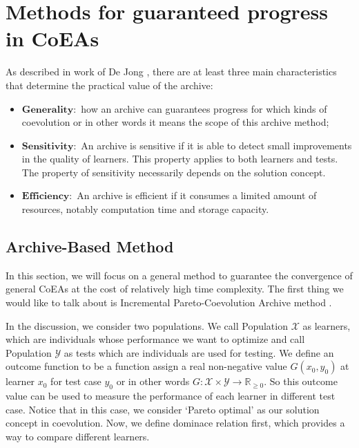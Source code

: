 \documentclass[a4paper,11pt]{report}
\theoremstyle{plain} %
\theoremstyle{definition} %
\theoremstyle{remark} %
\begin{document}
\section{Methods for guaranteed progress in CoEAs}
As described in work of De Jong \citep{kanade_incremental_2004}, there are at least three main characteristics that determine the practical value of the archive:
\begin{itemize}
    \item $\mathbf{Generality:}$ how an archive can guarantees progress for which kinds of coevolution or in other words it means the scope of this archive method;
    
    \item $\mathbf{Sensitivity:}$ An archive is sensitive if it is able to detect small improvements in the quality of learners. This property applies to both learners and tests. The property of sensitivity necessarily depends on the solution concept.
    
    \item $\mathbf{Efficiency:}$ An archive is efficient if it consumes a limited amount of resources, notably computation time and storage capacity.

\end{itemize}
\subsection{Archive-Based Method}
In this section, we will focus on a general method to guarantee the convergence of general CoEAs at the cost of relatively high time complexity. The first thing we would like to talk about is Incremental Pareto-Coevolution Archive method \citep{kanade_incremental_2004}.
\par In the discussion, we consider two populations. We call Population $\mathcal{X}$ as learners, which are individuals whose performance we want to optimize and call Population $\mathcal{Y}$ as tests which are individuals are used for testing. We define an outcome function to be a function assign a real non-negative value $G(x_{0},y_{0})$ at learner $x_{0}$ for test case $y_{0}$ or in other words $G:\mathcal{X}\times \mathcal{Y}\rightarrow \mathbb{R}_{\geq 0}$. So this outcome value can be used to measure the performance of each learner in different test case. Notice that in this case, we consider `Pareto optimal' as our solution concept in coevolution. Now, we define dominace relation first, which provides a way to compare different learners.
\end{document}
